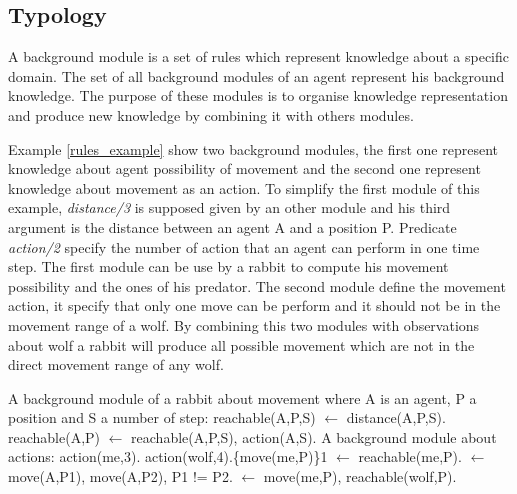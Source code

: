 \documentclass{aamas2012}
\begin{document}
\subsection{Typology}

	\begin{definition}
		A background module is a set of rules which represent knowledge about a specific domain.
		The set of all background modules of an agent represent his background knowledge.
		The purpose of these modules is to organise knowledge representation and produce
		new knowledge by combining it with others modules.
	\end{definition}
	
	Example \ref{rules_example} show two background modules, the first one represent knowledge about agent possibility of movement and 
	the second one represent knowledge about movement as an action.
	To simplify the first module of this example, \textit{distance/3} is supposed given by an other module and 
	his third argument is the distance between an agent A and a position P.
	Predicate \textit{action/2} specify the number of action that an agent can perform in one time step.
	The first module can be use by a rabbit to compute his movement possibility and the ones of his predator.
	The second module define the movement action, it specify that only one move can be perform and it should not be in the movement range of a wolf.
	By combining this two modules with observations about wolf a rabbit will produce all possible movement which are not in the direct movement range of any wolf.
	
	\begin{example}
		\label{rules_example}
		A background module of a rabbit about movement where A is an agent, P a position and S a number of step:\newline
		\newline
		reachable(A,P,S) $\leftarrow$ distance(A,P,S).\newline
		reachable(A,P) $\leftarrow$ reachable(A,P,S), action(A,S).
		\newline
		A background module about actions:\newline
		\newline
		action(me,3).\newline
		action(wolf,4).\{move(me,P)\}1 $\leftarrow$ reachable(me,P).\newline
		$\leftarrow$ move(A,P1), move(A,P2), P1 != P2.\newline
		$\leftarrow$ move(me,P), reachable(wolf,P).
	\end{example}
\end{document}
